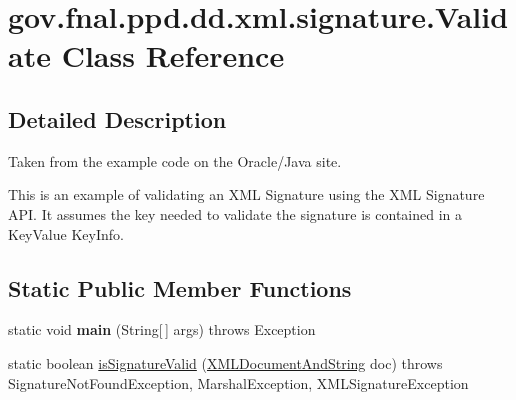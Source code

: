 \hypertarget{classgov_1_1fnal_1_1ppd_1_1dd_1_1xml_1_1signature_1_1Validate}{\section{gov.\-fnal.\-ppd.\-dd.\-xml.\-signature.\-Validate Class Reference}
\label{classgov_1_1fnal_1_1ppd_1_1dd_1_1xml_1_1signature_1_1Validate}
}


\subsection{Detailed Description}
Taken from the example code on the Oracle/\-Java site.

This is an example of validating an X\-M\-L Signature using the X\-M\-L Signature A\-P\-I. It assumes the key needed to validate the signature is contained in a Key\-Value Key\-Info. \subsection*{Static Public Member Functions}
\begin{DoxyCompactItemize}
\item 
\hypertarget{classgov_1_1fnal_1_1ppd_1_1dd_1_1xml_1_1signature_1_1Validate_abaf672a64ab32096e2f296b2543e13ab}{static void {\bfseries main} (String\mbox{[}$\,$\mbox{]} args)  throws Exception }\label{classgov_1_1fnal_1_1ppd_1_1dd_1_1xml_1_1signature_1_1Validate_abaf672a64ab32096e2f296b2543e13ab}

\item 
static boolean \hyperlink{classgov_1_1fnal_1_1ppd_1_1dd_1_1xml_1_1signature_1_1Validate_a9d0a0a1029bc2eeed35a10beb6ab3667}{is\-Signature\-Valid} (\hyperlink{classgov_1_1fnal_1_1ppd_1_1dd_1_1xml_1_1XMLDocumentAndString}{X\-M\-L\-Document\-And\-String} doc)  throws Signature\-Not\-Found\-Exception, Marshal\-Exception, X\-M\-L\-Signature\-Exception 
\end{DoxyCompactItemize}


